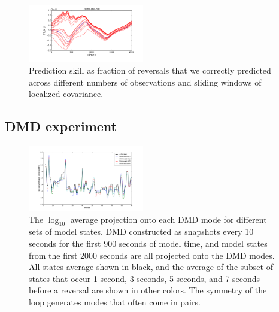 \begin{figure}[t]
  \centering
  \includegraphics[width=0.45\textwidth]{../figures/loop-spaghetti-slide-004-full.png}
  \caption[]{
    Prediction skill as fraction of reversals that we correctly predicted across different numbers of observations and sliding windows of localized covariance.
  }
  \label{fig:sliding_results}
\end{figure}

\subsection{DMD experiment}

\begin{figure}[t]
  \centering
  \includegraphics[width=0.45\textwidth]{../figures/DMD/DMD_modes_pre_reversals.png}
  \caption[]{
    The $\log_{10}$ average projection onto each DMD mode for different sets of model states.
    DMD constructed as snapshots every 10 seconds for the first 900 seconds of model time, and model states from the first 2000 seconds are all projected onto the DMD modes.
    All states average shown in black, and the average of the subset of states that occur 1 second, 3 seconds, 5 seconds, and 7 seconds before a reversal are shown in other colors.
    The symmetry of the loop generates modes that often come in pairs.
      }
  \label{fig:DMD_modes}
\end{figure}

